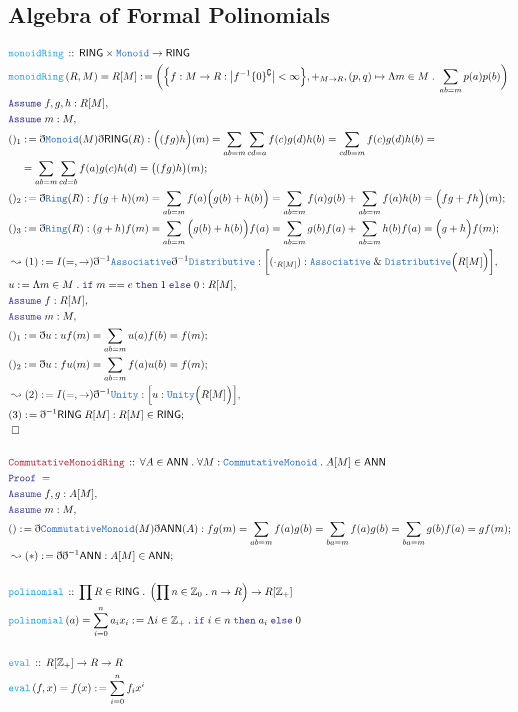 \documentclass[12pt]{scrartcl}
\newcommand{\TYPE}[1]{\textcolor{NavyBlue}{\mathtt{#1}}}
\newcommand{\FUNC}[1]{\textcolor{Cerulean}{\mathtt{#1}}}
\newcommand{\LOGIC}[1]{\textcolor{Blue}{\mathtt{#1}}}
\newcommand{\THM}[1]{\textcolor{Maroon}{\mathtt{#1}}}
\renewcommand{\.}{\; . \;}
\newcommand{\de}{: \kern 0.1pc =}
\newcommand{\If}{\LOGIC{if} \;}
\newcommand{\Then}{ \; \LOGIC{then} \;}
\newcommand{\Else}{\; \LOGIC{else} \;}
\newcommand{\Act}[1]{\left( #1 \right)}
\newcommand{\Theorem}[2]{& \THM{#1} \, :: \, #2 \\ & \Proof = \\ }
\newcommand{\DeclareFunc}[2]{& \FUNC{#1} \, :: \, #2 \\}
\newcommand{\DefineNamedFunc}[4]{&  \FUNC{#1}\Act{#2} = #3 \de #4 \\}
\newcommand{\NewLine}{\\ & \kern 1pc}
\newcommand{\Page}[1]{ \begin{align*} #1 \end{align*}   }
\newcommand{ \bd }{ \ByDef }
\renewcommand{\And}{\; \& \;}
\newcommand{\Int}{\mathbb{Z} }
\renewcommand{\c}{\complement}
\newcommand{\Say}[3]{& #1 \de #2 : #3, \\}
\newcommand{\Conclude}[3]{& #1 \de #2 : #3; \\}
\newcommand{\Derive}[3]{& \leadsto #1 \de #2 : #3, \\}
\newcommand{\DeriveConclude}[3]{& \leadsto #1 \de #2 : #3 ; \\}
\newcommand{\Assume}[2]{& \LOGIC{Assume} \; #1 : #2, \\}
\newcommand{\QED}{\; \square}
\newcommand{\EndProof}{& \QED \\}
\newcommand{\ByDef}{\eth}
\newcommand{\Proof}{\LOGIC{Proof} \; }
\newcommand{\RING}{\mathsf{RING}}
\newcommand{\ANN}{\mathsf{ANN}}
\begin{document}
\subsection{Algebra of Formal Polinomials}
\Page{
	\DeclareFunc{monoidRing}{\RING \times \TYPE{Monoid} \to \RING}
	\DefineNamedFunc{monoidRing}{R,M}{R[M]}
	{\bigg( \Big\{ f : M \to R : \big|f^{-1}\{0\}^\c\big| < \infty \Big\}, +_{M \to R}, (p,q) \mapsto \Lambda m \in M \. \sum_{ab = m} p(a)p(b)   \bigg) }
	\Assume{f,g,h}{R[M]}
	\Assume{m}{M}
	\Conclude{()_1}{\bd \TYPE{Monoid}(M)\bd \RING(R)}{ \Big((fg)h\Big)(m) = \sum_{ab = m} \sum_{cd = a} f(c)g(d)h(b) = \sum_{cdb = m} f(c)g(d)h(b) = 
		\NewLine = \sum_{ab = m} \sum_{cd = b } f(a)g(c)h(d) = \big((fg)h\big)(m) }
	\Conclude{()_2}{\bd \TYPE{Ring}(R)}{  f(g + h)(m) = \sum_{ab = m} f(a)\Big(g(b) + h(b) \Big) = \sum_{ab = m} f(a)g(b) + \sum_{ab = m} f(a)h(b) = \Big( fg + fh \Big)(m)   } 
	\Conclude{()_3}{\bd \TYPE{Ring}(R)}{  (g + h)f(m) = \sum_{ab = m} \Big(g(b) + h(b) \Big)f(a) = \sum_{ab = m} g(b)f(a) + \sum_{ab = m} h(b)f(a) = \Big( g + h \Big)f(m)   } 
	\Derive{(1)}{I(=,\to)\bd^{-1}\TYPE{Associative}\bd^{-1}\TYPE{Distributive}}{\bigg[(\cdot_{R[M]}) : \TYPE{Associative} \And \TYPE{Distributive}\Big( R[M]\Big) \bigg]}
	\Say{u}{ \Lambda m \in M \. \If m == e \Then 1 \Else 0    }{ R[M]}
	\Assume{f}{R[M]}
	\Assume{m}{M}
	\Conclude{()_1}{ \bd u }{uf(m) = \sum_{ab=m} u(a)f(b) = f(m) }
	\Conclude{()_2}{\bd u}{ fu(m) = \sum_{ab = m} f(a)u(b) = f(m)}
	\Derive{(2)}{I(=,\to)\bd^{-1}\TYPE{Unity}}{\Big[ u : \TYPE{Unity}\Big( R[M] \Big) \Big]}
	\Conclude{(3)}{\bd^{-1}\RING \; R[M]}{R[M] \in \RING}
	\EndProof
	\\
	\Theorem{CommutativeMonoidRing}{\forall A \in \ANN \. \forall M : \TYPE{CommutativeMonoid} \. A[M] \in \ANN }
	\Assume{f,g}{A[M]}
	\Assume{m}{M}
	\Conclude{()}{\bd \TYPE{CommutativeMonoid}(M)\bd \ANN(A)}{fg(m) = \sum_{ab = m} f(a)g(b) = \sum_{ba=m} f(a)g(b)  = \sum_{ba=m} g(b)f(a) = gf(m) }
	\DeriveConclude{(*)}{\bd\bd^{-1}\ANN}{A[M] \in \ANN}
	\\
	\DeclareFunc{polinomial}{\prod R \in \RING \. \left( \prod n \in \Int_0 \. n \to R\right) \to R[\Int_+]}
	\DefineNamedFunc{polinomial}{a}{\sum^n_{i=0} a_i x_i }{\Lambda i \in \Int_+ \. \If i \in n \Then  a_i \Else 0}
	\\
	\DeclareFunc{eval}{ R[\Int_+] \to R \to R  }
	\DefineNamedFunc{eval}{f,x}{f(x)}{\sum^n_{i=0} f_ix^i}
}
\end{document}
